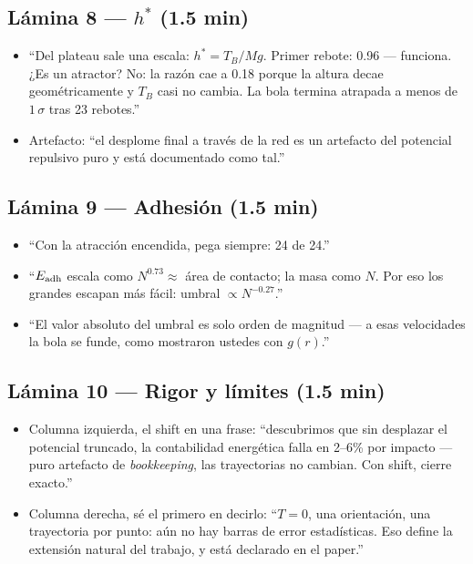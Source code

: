 \documentclass[11pt,a4paper]{article}
\begin{document}
\subsection*{Lámina 8 --- \texorpdfstring{$h^*$}{h*} (1.5 min)}
\begin{itemize}[leftmargin=1.4em]
    \item ``Del plateau sale una escala: $h^*=T_B/Mg$. Primer rebote:
    0.96 --- funciona. ¿Es un atractor? No: la razón cae a 0.18 porque la
    altura decae geométricamente y $T_B$ casi no cambia. La bola termina
    atrapada a menos de $1\,\sigma$ tras 23 rebotes.''
    \item Artefacto: ``el desplome final a través de la red es un
    artefacto del potencial repulsivo puro y está documentado como tal.''
\end{itemize}

\subsection*{Lámina 9 --- Adhesión (1.5 min)}
\begin{itemize}[leftmargin=1.4em]
    \item ``Con la atracción encendida, pega siempre: 24 de 24.''
    \item ``$E_{\rm adh}$ escala como $N^{0.73}\approx$ área de contacto;
    la masa como $N$. Por eso los grandes escapan más fácil: umbral
    $\propto N^{-0.27}$.''
    \item ``El valor absoluto del umbral es solo orden de magnitud --- a
    esas velocidades la bola se funde, como mostraron ustedes con
    $g(r)$.''
\end{itemize}

\subsection*{Lámina 10 --- Rigor y límites (1.5 min)}
\begin{itemize}[leftmargin=1.4em]
    \item Columna izquierda, el shift en una frase: ``descubrimos que sin
    desplazar el potencial truncado, la contabilidad energética falla en
    2--6\% por impacto --- puro artefacto de \emph{bookkeeping}, las
    trayectorias no cambian. Con shift, cierre exacto.''
    \item Columna derecha, sé el primero en decirlo: ``$T=0$, una
    orientación, una trayectoria por punto: aún no hay barras de error
    estadísticas. Eso define la extensión natural del trabajo, y está
    declarado en el paper.''
\end{itemize}
\end{document}
